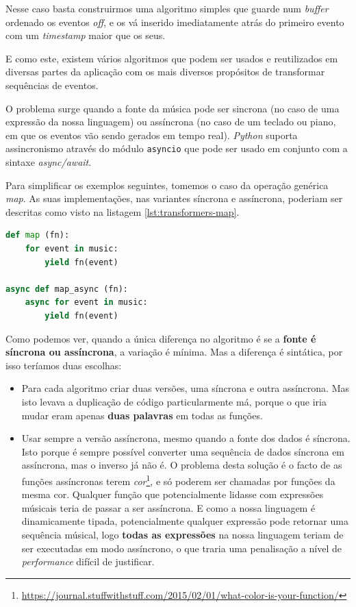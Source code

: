 Nesse caso basta construirmos uma algoritmo simples que guarde num \textit{buffer} ordenado os eventos \textit{off}, e os vá inserido imediatamente atrás do primeiro evento com um \textit{timestamp} maior que os seus.

E como este, existem vários algoritmos que podem ser usados e reutilizados em diversas partes da aplicação com os mais diversos propósitos de transformar sequências de eventos.

O problema surge quando a fonte da música pode ser sincrona (no caso de uma expressão da nossa linguagem) ou assíncrona (no caso de um teclado ou piano, em que os eventos vão sendo gerados em tempo real). \textit{Python} suporta assincronismo através do módulo \texttt{asyncio} que pode ser usado em conjunto com a sintaxe \textit{async/await}.

Para simplificar os exemplos seguintes, tomemos o caso da operação genérica \textit{map}. As suas implementações, nas variantes síncrona e assíncrona, poderiam ser descritas como visto na listagem \ref{lst:transformers-map}.

\begin{lstlisting}[caption={Exemplo de uma função \texttt{map} com versões sincronas e asíncronas},label={lst:transformers-map},language=Python]
def map (fn):
    for event in music:
        yield fn(event)

async def map_async (fn):
    async for event in music:
        yield fn(event)
\end{lstlisting}

Como podemos ver, quando a única diferença no algoritmo é se a \textbf{fonte é síncrona ou assíncrona}, a variação é mínima. Mas a diferença é sintática, por isso teríamos duas escolhas:
\begin{itemize}
 \item Para cada algoritmo criar duas versões, uma síncrona e outra assíncrona. Mas isto levava a duplicação de código particularmente má, porque o que iria mudar eram apenas \textbf{duas palavras} em todas as funções.
 
 \item Usar sempre a versão assíncrona, mesmo quando a fonte dos dados é síncrona. Isto porque é sempre possível converter uma sequência de dados síncrona em assíncrona, mas o inverso já não é. O problema desta solução é o facto de as funções assíncronas terem \textit{cor}\footnote{\url{https://journal.stuffwithstuff.com/2015/02/01/what-color-is-your-function/}}, e só poderem ser chamadas por funções da mesma cor. Qualquer função que potencialmente lidasse com expressões músicais teria de passar a ser assíncrona. E como a nossa linguagem é dinamicamente tipada, potencialmente qualquer expressão pode retornar uma sequência músical, logo \textbf{todas as expressões} na nossa linguagem teriam de ser executadas em modo assíncrono, o que traria uma penalisação a nível de \textit{performance} difícil de justificar.
\end{itemize}


